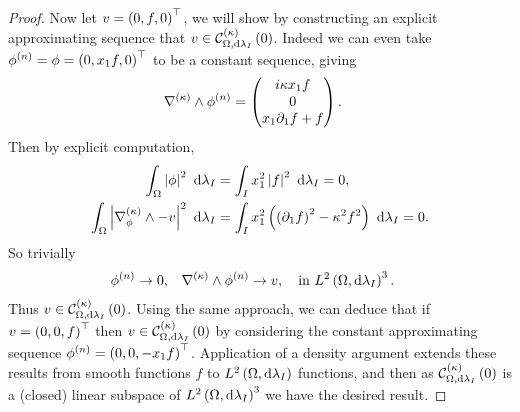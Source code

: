 \begin{proof}
	Now let $v=\left( 0,f,0 \right)^{\top}$, we will show by constructing an explicit approximating sequence that $v\in\mathcal{C}_{ \Omega, \mathrm{d}\lambda_I}^{(\kappa)}\left( 0 \right)$.
	Indeed we can even take $\phi^{(n)} = \phi = \left( 0,x_1 f,0 \right)^{\top}$ to be a constant sequence, giving
	\begin{align*}
		\nabla_{}^{(\kappa)}\wedge\phi^{(n)} &= \begin{pmatrix} i\kappa x_1 f \\ 0 \\ x_1\partial_1 f + f	\end{pmatrix}.
	\end{align*}
	Then by explicit computation, 
	\begin{align*}
		\int_{\Omega}\left\lvert \phi \right\rvert^2 \ \mathrm{d}\lambda_I &= \int_{I}x_1^2\left\lvert f \right\rvert^2 \ \mathrm{d}\lambda_I = 0, \\
		\int_{\Omega}\left\lvert \nabla_{\phi}^{(\kappa)}\wedge - v \right\rvert^2 \ \mathrm{d}\lambda_I &= \int_{I}x_1^2\left(  \left( \partial_1 f \right)^2 - \kappa^2 f^2 \right) \ \mathrm{d}\lambda_I = 0.
	\end{align*}
	So trivially
	\begin{align*}
		\phi^{(n)} \rightarrow 0,
		&\quad \nabla_{}^{(\kappa)}\wedge\phi^{(n)} \rightarrow v,
		\quad\text{in } L^{2}\left( \Omega,\mathrm{d}\lambda_I \right)^3.
	\end{align*}
	Thus $v\in\mathcal{C}_{ \Omega, \mathrm{d}\lambda_I}^{(\kappa)}\left( 0 \right)$.
	Using the same approach, we can deduce that if $v=\left( 0,0,f \right)^{\top}$ then $v\in\mathcal{C}_{ \Omega, \mathrm{d}\lambda_I}^{(\kappa)}\left( 0 \right)$ by considering the constant approximating sequence $\phi^{(n)} = \left( 0,0,-x_1 f \right)^{\top}$.
	Application of a density argument extends these results from smooth functions $f$ to $L^{2}\left( \Omega,\mathrm{d}\lambda_I \right)$ functions, and then as $\mathcal{C}_{ \Omega, \mathrm{d}\lambda_I}^{(\kappa)}\left( 0 \right)$ is a (closed) linear subspace of $L^{2}\left( \Omega,\mathrm{d}\lambda_I \right)^3$ we have the desired result.
\end{proof}


